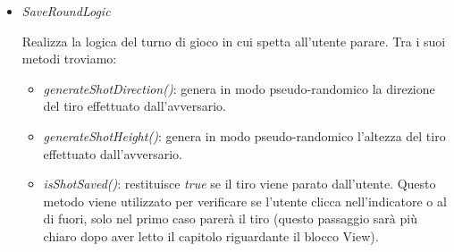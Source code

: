 \documentclass[12pt,a4paper]{report}
\begin{document}
\begin{itemize}
Realizza la logica del turno di gioco in cui spetta all’utente tirare. Tra i suoi metodi troviamo: 
\begin{itemize}
      \item \emph{generateRegionSaveAttempt()}: genera in modo pseudo-randomico la regione della porta dove il portiere avversario proverà a parare il tiro. Se il tiro è ``debole`` (vedi metodo \emph{isWeakShot()}) la regione generata sarà la stessa del tiro.
     \item \emph{isPerfectShot()}: restituisce \emph{true} se il tiro è effettuato molto vicino ad uno dei quattro angoli della porta con una potenza elevata, rendendo il tiro impossibile da parare per il portiere avversario.
     \item \emph{isWeakShot()}: restituisce \emph{true} se il tiro è molto debole, rendendolo sempre parabile dal portiere, a prescindere dalla direzione ed altezza del tiro.
     \item \emph{isShotSaved()}: avvalendosi dei tre metodi precedentemente illustrati, restituisce \emph{true} se il tiro viene parato direttamente dal portiere avversario. Il tiro viene parato se la regione dove avviene il tentativo di parata corrisponde alla regione del tiro e non si tratta di un tiro ``perfetto`` (\emph{isPerfectShot()} restituisce \emph{false}), oppure se si tratta di un tiro ``debole`` (\emph{isWeakShot()} restituisce \emph{true}).
     \item \emph{isGoal()}: restituisce \emph{true} se il tiro è direzionato verso la porta e non viene parato dal portiere.
\end{itemize}

\item\emph{SaveRoundLogic}

Realizza la logica del turno di gioco in cui spetta all’utente parare. Tra i suoi metodi troviamo: 
\begin{itemize}
      \item \emph{generateShotDirection()}: genera in modo pseudo-randomico la direzione del tiro effettuato dall'avversario.
      \item \emph{generateShotHeight()}: genera in modo pseudo-randomico l'altezza del tiro effettuato dall'avversario.
      \item \emph{isShotSaved()}: restituisce \emph{true} se il tiro viene parato dall'utente. Questo metodo viene utilizzato per verificare se l'utente clicca nell'indicatore o al di fuori, solo nel primo caso parerà il tiro (questo passaggio sarà più chiaro dopo aver letto il capitolo riguardante il blocco View).
\end{itemize} 


\end{itemize}
\end{document}
